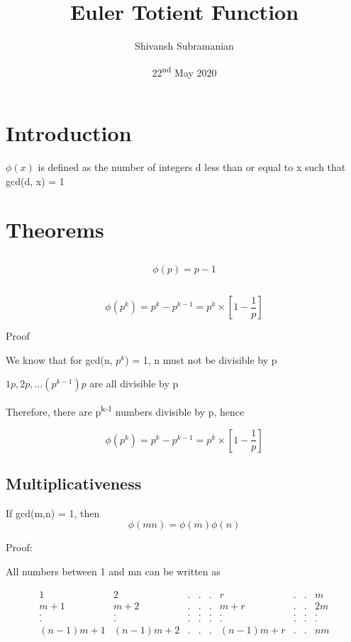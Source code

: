 \documentclass{article}
\title{Euler Totient Function}
\author{ Shivansh Subramanian }
\date{22\textsuperscript{nd} May 2020}
\begin{document}
\maketitle

\section{Introduction}
\( \phi(x) \) is defined as the number of integers d less than or equal to x such that gcd(d, x) = 1

\section{Theorems}
\subsection{}

\[
    \phi(p) = p -1 
\]

\subsection{}
\[
    \phi(p^k) = p^k - p^{k-1} = p^{k} \times [1- \frac{1}{p}]
\]

Proof

We know that for gcd(n, \(p^k\)) = 1, n must not be divisible by p

\(
    1p, 2p, . . . (p^{k-1})p\) are all divisible by p
    
Therefore, there are p\textsuperscript{k-1} numbers divisible by p, hence 

\[
    \phi(p^k) = p^k - p^{k-1} = p^{k} \times [1- \frac{1}{p}]
\]


\subsection{Multiplicativeness}
If gcd(m,n) = 1, then 
\[
    \phi(mn) = \phi(m) \phi(n)
\]

Proof: 

All numbers between 1 and mn can be written as 

$$
\begin{matrix}
    1 & 2 & . &. &. & r &. &. & m           \\
    {m+1} & {m+2} & . & . & . & {m+r} & . & . & {2m}            \\
    . & . & . &. &. & . &. &. & .           \\
    . & . & . &. &. & . &. &. & .           \\
    {(n-1)m+1} & {(n-1)m+2} & . & . & . & {(n-1)m+r} & . & . & {nm}            \\
\end{matrix}
$$
\end{document}
